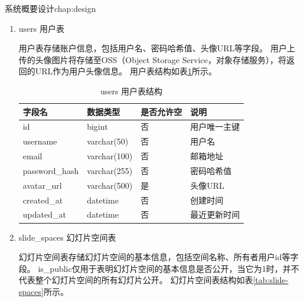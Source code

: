 \begin{cuzchapter}{系统概要设计}{chap:design}
\begin{enumerate}
    \item users 用户表

    用户表存储账户信息，包括用户名、密码哈希值、头像URL等字段。
    用户上传的头像图片将存储至OSS（Object Storage Service，对象存储服务），将返回的URL作为用户头像信息。
    用户表结构如表\ref{tab:users}所示。

    \begin{table}[htbp]
        \centering
        \caption{users 用户表结构}
        \label{tab:users}
        \begin{tabular}{llll}
            \toprule
            字段名                    & 数据类型         & 是否允许空 & 说明        \\
            \midrule
            id                     & bigint       & 否     & 用户唯一主键    \\
            username               & varchar(50)  & 否     & 用户名       \\
            email                  & varchar(100) & 否     & 邮箱地址      \\
            password\_hash         & varchar(255) & 否     & 密码哈希值     \\
            avatar\_url            & varchar(500) & 是     & 头像URL     \\
            created\_at            & datetime     & 否     & 创建时间      \\
            updated\_at            & datetime     & 否     & 最近更新时间    \\
            \bottomrule
        \end{tabular}
    \end{table}

    \item slide\_spaces 幻灯片空间表

    幻灯片空间表存储幻灯片空间的基本信息，包括空间名称、所有者用户id等字段。
    is\_public仅用于表明幻灯片空间的基本信息是否公开，当它为1时，并不代表整个幻灯片空间的所有幻灯片公开。
    幻灯片空间表结构如表\ref{tab:slide-spaces}所示。


\end{enumerate}
\end{cuzchapter}
